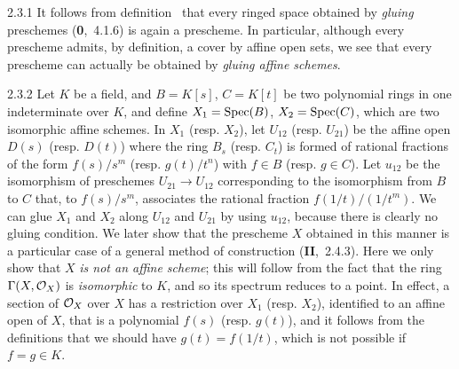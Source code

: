 
\begin{env}{2.3.1}
\label{env-1.2.3.1}
 It follows from definition~ that every ringed space obtained by
\emph{gluing} preschemes (\textbf{0},~4.1.6) is again a prescheme. In particular, although every
prescheme admits, by definition, a cover by affine open sets, we see that every prescheme can
actually be obtained by \emph{gluing affine schemes}.
\end{env}

\begin{envr}[Example]{2.3.2}
\label{exm-1.2.3.2}
 Let $K$ be a field, and $B=K[s]$, $C=K[t]$ be two polynomial rings in one indeterminate over $K$,
and define $X_1=\operatorname{Spec}(B)$, $X_2=\operatorname{Spec}(C)$, which are two isomorphic affine schemes.
In $X_1$ (resp. $X_2$), let $U_{12}$ (resp. $U_{21}$) be the affine open $D(s)$ (resp. $D(t)$) where
the ring $B_s$ (resp. $C_t$) is formed of rational fractions of the form $f(s)/s^m$ (resp. $g(t)/t^n$)
with $f\in B$ (resp. $g\in C$). Let $u_{12}$ be the isomorphism of preschemes $U_{21}\to U_{12}$
corresponding  to the isomorphism from $B$ to $C$ that, to $f(s)/s^m$, associates
the rational fraction $f(1/t)/(1/t^m)$. We can glue $X_1$ and $X_2$ along $U_{12}$ and $U_{21}$ by
using $u_{12}$, because there is clearly no gluing condition. We later show that the prescheme $X$
obtained in this manner is a particular case of a general method of construction (\textbf{II},~2.4.3).
Here we only show that $X$ \emph{is not an affine scheme}; this will follow from the fact that the ring
$\Gamma(X,\mathcal{O}_X)$ is \emph{isomorphic} to $K$, and so its spectrum reduces to a point. In effect, a section
of $\mathcal{O}_X$ over $X$ has a restriction over $X_1$ (resp. $X_2$), identified to an affine open of $X$, that
is a polynomial $f(s)$ (resp. $g(t)$), and it follows from the definitions that we should have $g(t)=f(1/t)$,
which is not possible if $f=g\in K$.
\end{envr}

